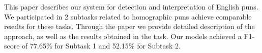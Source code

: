 This paper describes our system for detection and interpretation of English puns. We participated in 2 subtasks related to homographic puns achieve comparable results for these tasks. Through the paper we provide detailed description of the approach, as well as the results obtained in the task. Our models achieved a F1-score of 77.65\% for Subtask 1 and 52.15\% for Subtask 2.
